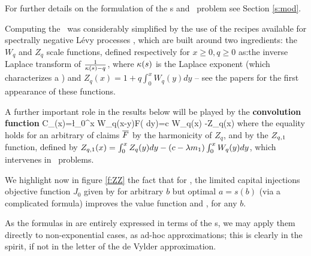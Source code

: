 For further details on the formulation of the \div s and \ci\ problem see Section \ref{s:mod}.

Computing the \valf\  was considerably simplified  by the use of the \fp  recipes   available for spectrally negative L\'evy processes \cite{Kyp,KKR,AGV},  which are built around   two ingredients: the  $W_q $ and $Z_q$ scale functions, defined respectively  for $x \geq 0, q \geq 0$ as:\BEN \im the inverse Laplace transform  of $\frac 1{\kappa(s)-q}$, where $\kappa(s)$ is the Laplace exponent (which characterizes a \lev \proc) and \im
$Z_q(x)=1+q\int_0^xW_q(y)dy$\EEN
 -- see the papers \cite{Suprun,Ber,AKP} for the first appearance of these functions.

A further important role in the results below will be played by the {\bf convolution function}
\be C_\q(x)=\l \int_0^{x} W_q(x-y)\ovl F( dy)=c {W_q(x)}  -Z_q(x) %
\ee
where the equality holds for an  arbitrary \sur \fun of claims $\overline F$ by the harmonicity of $Z_q$, and by the $\Z1$ function, defined by
$\Z1(x)=\int_0^x Z_q(y)dy-(c- \l m_1) \int_0^x W_q(y)dy$, which intervenes in \ci\ problems.



We   highlight now in  figure \ref{f:ZZ} the fact  that for \expoj, the limited capital injections objective function $J_0$  given by  for arbitrary $b$ but optimal $a=s(b)$ (via a complicated formula)  improves
the value function \wrt \deF and \SLG, for any $b$.






  As the formulas in \cite{AGLW} are entirely expressed in terms of the \sf s, we may apply them directly to non-exponential cases, as  ad-hoc  approximations; this  is clearly in the spirit, if not in the letter  of the de Vylder approximation.




